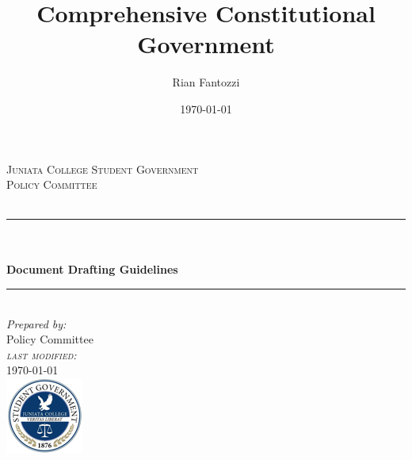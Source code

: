 \documentclass[12pt, letterpaper]{report}
\title{Comprehensive Constitutional Government}
\author{Rian Fantozzi}
\date{\today}
\newcommand{\HRule}{\rule{\linewidth}{0.5mm}}
\begin{document}
		\begin{titlepage}
		\center 
		\textsc{\LARGE Juniata College Student Government}\\[1cm] %
		\textsc{\Large Policy Committee}\\[0.5cm] %
		\textsc{\large \textit{}}\\[0.5cm] %
		\HRule \\[0.4cm]
		{\Huge \bfseries\\ Document Drafting Guidelines }\\[0.4cm] %
		\HRule \\[1.5cm]
		
		
		
		\Large \emph{Prepared by:}\\
        {Policy Committee}\\[2.5cm] %

		{\large \textit{\textsc{last modified:\\}}\today}\\[1cm] %
		
		
		\includegraphics{studgov-small.png}\\[0.5cm] %
		
		
		\vfill %
		
	\end{titlepage}
\end{document}
